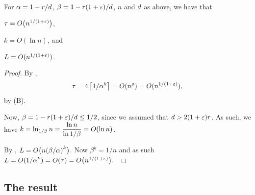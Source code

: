 \begin{lemma}
    For $\alpha = 1-{r}/{d}$, $\beta = 1 -
    {r(1+{\varepsilon})}/{d}$, $n$ and $d$ as above, we have that
    \begin{enumerate*}[label=\Roman*.]
        \item
        $\tau =O\pth{n^{1/(1+\eps)}}$,
        \item $k = O( \ln n)$, and 
        \item $L = O(n^{1/(1+{\varepsilon})})$.
    \end{enumerate*}

\end{lemma}
\begin{proof}
    By ,
    \[
    \tau = 4 \ceil{1/\alpha^k} = O\pth{ n^{\rho} } =
    O(n^{1/(1+\eps)}),
    \]
    by (B).

    Now, $\beta = 1 - {r(1+{\varepsilon})}/{d} \leq 1/2$, since we
    assumed that $d > 2 (1+{\varepsilon})r$. As such, we have $\ds k =
    \ln_{1/\beta} n = \frac{\ln n}{\ln 1/\beta} = O \pth{ \ln n}$.

    By , $L = O\bigl( n \pth{\beta/\alpha}^k
    \bigr)$. Now $\beta^k = 1/n$ and as such
    \begin{math}
        L = O( 1/\alpha^k ) = O(\tau) = O\bigl(n^{1/(1+{\varepsilon})}\bigr).
    \end{math}~
\end{proof}




\subsection{The result}

